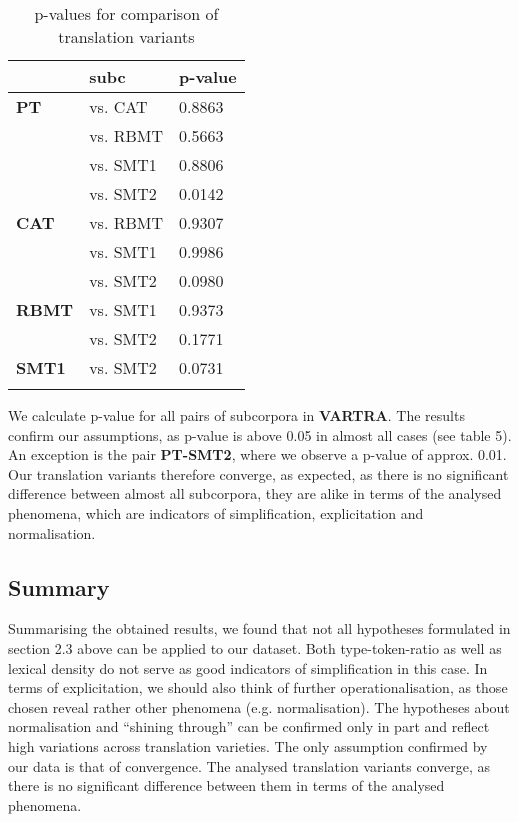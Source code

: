 \documentclass[output=paper]{LSP/langsci}
\begin{document}
\begin{table}
     \centering
     \begin{tabular}{lll}
          \lsptoprule
               & \textbf{subc}    & \textbf{p-value}  \\ \midrule
\textbf{PT}	   & vs. CAT   & 0.8863     \\ 
	  	       & vs. RBMT  & 0.5663      \\ 
		       & vs. SMT1  & 0.8806       \\
		       & vs. SMT2  & 0.0142        \\ \midrule
\textbf{CAT}   & vs. RBMT  & 0.9307         \\ 
			   & vs. SMT1  & 0.9986  		 \\
			   & vs. SMT2  & 0.0980           \\ \midrule
\textbf{RBMT}  & vs. SMT1  & 0.9373            \\ 
			   & vs. SMT2  & 0.1771			    \\ \midrule
\textbf{SMT1}  & vs. SMT2  & 0.0731 	         \\ 
\lspbottomrule
     \end{tabular}

 \caption{p-values for comparison of translation variants}
     \label{4.5}
\end{table}   

We calculate p-value for all pairs of subcorpora in \textbf{VARTRA}. The results confirm our assumptions, as p-value is above 0.05 in almost all cases (see table 5). An exception is the pair \textbf{PT-SMT2}, where we observe a p-value of approx. 0.01. Our translation variants therefore converge, as expected, as there is no significant difference between almost all subcorpora, they are alike in terms of the analysed phenomena, which are indicators of simplification, explicitation and normalisation.

\subsection{Summary}

Summarising the obtained results, we found that not all hypotheses formulated in section 2.3 above can be applied to our dataset. Both type-token-ratio as well as lexical density do not serve as good indicators of simplification in this case. In terms of explicitation, we should also think of further operationalisation, as those chosen reveal rather other phenomena (e.g. normalisation).  The hypotheses about normalisation and “shining through” can be confirmed only in part and reflect high variations across translation varieties.  The only assumption confirmed by our data is that of convergence.  The analysed translation variants converge, as there is no significant difference between them in terms of the analysed phenomena.
\end{document}
